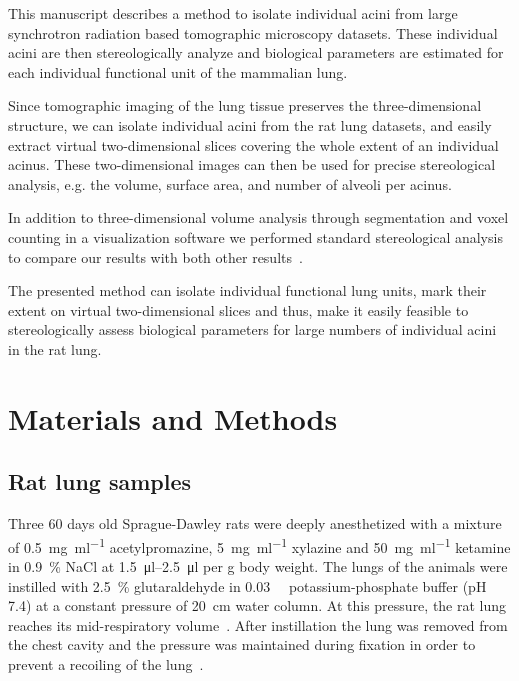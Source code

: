 \documentclass[a4paper,DIV=calc,abstract,english]{scrartcl}
\begin{document}
This manuscript describes a method to isolate individual acini from large synchrotron radiation based tomographic microscopy datasets.
These individual acini are then stereologically analyze and biological parameters are estimated for each individual functional unit of the mammalian lung.

Since tomographic imaging of the lung tissue preserves the three-dimensional structure, we can isolate individual acini from the rat lung datasets, and easily extract virtual two-dimensional slices covering the whole extent of an individual acinus.
These two-dimensional images can then be used for precise stereological analysis, e.g. the volume, surface area, and number of alveoli per acinus.

In addition to three-dimensional volume analysis through segmentation and voxel counting in a visualization software we performed standard stereological analysis~\cite{Hsia2010} to compare our results with both other results~\cite{Rodriguez1987,Tschanz2003,Mercer1987a}.

The presented method can isolate individual functional lung units, mark their extent on virtual two-dimensional slices and thus, make it easily feasible to stereologically assess biological parameters for large numbers of individual acini in the rat lung.

\section{Materials and Methods}
\label{sec:materials and methods}
\subsection{Rat lung samples}
Three 60 days old Sprague-Dawley rats were deeply anesthetized with a mixture of %
\SI[per-mode=fraction]{0.5}{\milli\gram\per\milli\litre} acetylpromazine, %
\SI[per-mode=fraction]{5}{\milli\gram\per\milli\litre} xylazine and %
\SI[per-mode=fraction]{50}{\milli\gram\per\milli\litre} ketamine in %
\SI{0.9}{\percent} NaCl at \SIrange{1.5}{2.5}{\micro\litre} per \si{\gram} body weight.
The lungs of the animals were instilled with \SI{2.5}{\percent} glutaraldehyde in \SI{0.03}{\milli\Molar} potassium-phosphate buffer (pH 7.4) at a constant pressure of \SI{20}{\centi\meter} water column.
At this pressure, the rat lung reaches its mid-respiratory volume~\cite{Schittny1998}.
After instillation the lung was removed from the chest cavity and the pressure was maintained during fixation in order to prevent a recoiling of the lung~\cite{Mund2008}.
\end{document}

